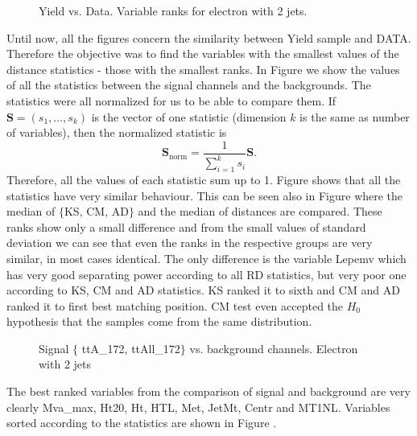 \begin{figure}[h!]
    \quad
    \caption{Yield vs. Data. Variable ranks for electron with 2 jets.}
    \label{fig:e2j-RD}
\end{figure}

Until now, all the figures concern the similarity between Yield sample and DATA. Therefore the objective was to find the variables with the smallest values of the distance statistics - those with the smallest ranks. In Figure  we show the values of all the statistics between the signal channels and the backgrounds. The statistics were all normalized for us to be able to compare them. If $\mathbf{S} = (s_1,\ldots,s_k)$ is the vector of one statistic (dimension $k$ is the same as number of variables), then the normalized statistic is 
\begin{equation*}
\mathbf{S}_\mathrm{norm} = \dfrac{1}{\sum_{i=1}^k s_i} \mathbf{S}.
\end{equation*}
Therefore, all the values of each statistic sum up to 1. Figure  shows that all the statistics have very similar behaviour. This can be seen also in Figure  where the median of $\lbrace$KS, CM, AD$\rbrace$ and the median of \ren distances are compared. These ranks show only a small difference and from the small values of standard deviation we can see that even the ranks in the respective groups are very similar, in most cases identical. The only difference is the variable \textsf{Lepemv} which has very good separating power according to all RD statistics, but very poor one according to KS, CM and AD statistics. KS ranked it to sixth and CM and AD ranked it to first best matching position. CM test even accepted the $H_0$ hypothesis that the samples come from the same distribution.  
\begin{figure}[h]
\quad
    \caption{Signal $\lbrace$ \textsf{ttA\_172},  \textsf{ttAll\_172}$\rbrace$ vs. background channels. Electron with 2 jets}
    \label{fig:e2j-SBGmed}
\end{figure}
The best ranked variables from the comparison of signal and background are very clearly \textsf{Mva\_max, Ht20, Ht, HTL, Met, JetMt, Centr  } and \textsf{MT1NL}. Variables sorted according to the statistics are shown in Figure .

